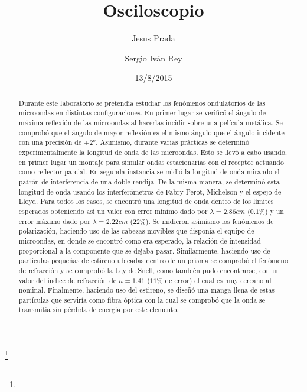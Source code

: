 \documentclass[%
 reprint,
 amsmath,amssymb,
 aps,
]{revtex4-1}
\begin{document}

\title{Osciloscopio}%
\thanks{}%

\author{Jesus Prada}
\author{Sergio Iv\'an Rey}%
%

\date{13/8/2015}%

\begin{abstract}
Durante este laboratorio se pretendía estudiar los fenómenos ondulatorios de las microondas en distintas configuraciones. En primer lugar se verificó el ángulo de máxima reflexión de las microondas al hacerlas incidir sobre una película metálica. Se comprobó que el ángulo de mayor reflexión es el mismo ángulo que el ángulo incidente con una precisión de $\pm2^o$. Asimismo, durante varias prácticas se determinó experimentalmente la longitud de onda de las microondas. Esto se llevó a cabo usando, en primer lugar un montaje para simular ondas estacionarias con el receptor actuando como reflector parcial. En segunda instancia se midió la longitud de onda mirando el patrón de interferencia de una doble rendija. De la misma manera, se determinó esta longitud de onda usando los interferómetros de Fabry-Perot, Michelson y el espejo de Lloyd. Para todos los casos, se encontró una longitud de onda dentro de los límites esperados obteniendo así un valor con error mínimo dado por $\lambda = 2.86cm$ ($0.1\%$) y un error máximo dado por $\lambda= 2.22cm$ ($22\%$). Se midieron asimismo los fenómenos de polarización, haciendo uso de las cabezas movibles que disponía el equipo de microondas, en donde se encontró como era esperado, la relación de intensidad proporcional a la componente que se dejaba pasar. Similarmente, haciendo uso de partículas pequeñas de estireno ubicadas dentro de un prisma se comprobó el fenómeno de refracción y se comprobó la Ley de Snell, como también pudo encontrarse, con un valor del índice de refracción de $n = 1.41$ ($11\%$ de error) el cual es muy cercano al nominal. Finalmente, haciendo uso del estireno, se diseñó una manga llena de estas partículas que serviría como fibra óptica con la cual se comprobó que la onda se transmitía sin pérdida de energía por este elemento. \\
\end{abstract}
\end{document}
